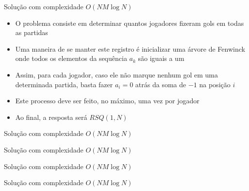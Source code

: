 \begin{frame}[fragile]{Solução com complexidade $O(NM\log N)$}

    \begin{itemize}
        \item O problema consiste em determinar quantos jogadores fizeram gols em todas as
            partidas

        \item Uma maneira de se manter este registro é inicializar uma árvore de Fenwinck 
            onde todos os elementos da sequência $a_k$ são iguais a um

        \item Assim, para cada jogador, caso ele não marque nenhum gol em uma determinada 
            partida, basta fazer $a_i = 0$ atrás da soma de $-1$ na posição $i$

        \item Este processo deve ser feito, no máximo, uma vez por jogador

        \item Ao final, a resposta será $RSQ(1, N)$

   \end{itemize}

\end{frame}

\begin{frame}[fragile]{Solução com complexidade $O(NM\log N)$}
\end{frame}

\begin{frame}[fragile]{Solução com complexidade $O(NM\log N)$}
\end{frame}

\begin{frame}[fragile]{Solução com complexidade $O(NM\log N)$}
\end{frame}

\begin{frame}[fragile]{Solução com complexidade $O(NM\log N)$}
\end{frame}

